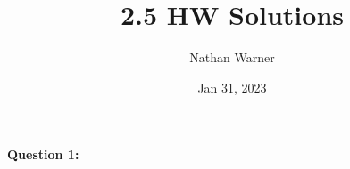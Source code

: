 \documentclass{report}
\title{\Huge{2.5 HW Solutions}}
\author{\huge{Nathan Warner}}
\date{\huge{Jan 31, 2023}}
\begin{document}
    \maketitle
    \begin{Large}
        \noindent \textbf{Question 1:}
    \end{Large} 

    \bigbreak \noindent 
     
\end{document}
